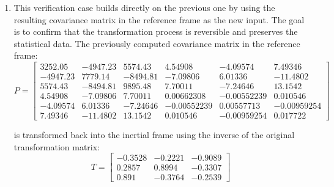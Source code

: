 \documentclass[11pt,fleqn]{report}
\begin{document}
\begin{enumerate}
{The expected covariance matrix
in the reference frame is computed by transforming each state vector using this
rotation and then calculating the covariance from the transformed set of states:
\begin{equation*}
P = 
\begin{bmatrix}
3252.05	 & -4947.23	&5574.43 &4.54908	 & -4.09574	 &7.49346 \\
-4947.23 &	7779.14	& -8494.81 & -7.09806	 &6.01336	 & -11.4802 \\
5574.43	 & -8494.81	&9895.48 &7.70011	 & -7.24646	 &13.1542 \\
4.54908	 & -7.09806	&7.70011 &0.00662308 & -0.00552239 & 	0.010546\\
-4.09574 & 	6.01336	& -7.24646 & -0.00552239 & 	0.00557713 & -0.00959254\\
7.49346	 & -11.4802	&13.1542 &0.010546	 & -0.00959254 &0.017722
\end{bmatrix}
\end{equation*}
}
\item{
This verification case builds directly on the previous one by using the resulting 
covariance matrix in the reference frame as the new input. The goal is to confirm 
that the transformation process is reversible and preserves the statistical 
data. The previously computed covariance matrix in the reference frame:
\begin{equation*}
P = 
\begin{bmatrix}
3252.05	 & -4947.23	&5574.43 &4.54908	 & -4.09574	 &7.49346 \\
-4947.23 &	7779.14	& -8494.81 & -7.09806	 &6.01336	 & -11.4802 \\
5574.43	 & -8494.81	&9895.48 &7.70011	 & -7.24646	 &13.1542 \\
4.54908	 & -7.09806	&7.70011 &0.00662308 & -0.00552239 & 	0.010546\\
-4.09574 & 	6.01336	& -7.24646 & -0.00552239 & 	0.00557713 & -0.00959254\\
7.49346	 & -11.4802	&13.1542 &0.010546	 & -0.00959254 &0.017722
\end{bmatrix}
\end{equation*}

is transformed back into the inertial frame using the inverse of the 
original transformation matrix:
\begin{equation*}
T = 
\begin{bmatrix}
-0.3528	& -0.2221 &	-0.9089 \\
 0.2857 &0.8994 &	-0.3307 \\
 0.891	& -0.3764 &	-0.2539
\end{bmatrix}
\end{equation*}

}
\end{enumerate}
\end{document}

